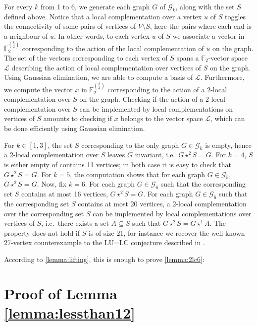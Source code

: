 \documentclass[a4paper,UKenglish,cleveref,autoref,thm-restate]{arxiv}
\newcommand{\se}{\subseteq}
\newcommand{\sm}{\setminus}
\begin{document}
For every $k$ from 1 to 6, we generate each graph $G$ of $\mathcal G_k$, along with the set $S$ defined above. Notice that a local complementation over a vertex $u$ of $S$ toggles the connectivity of some pairs of vertices of $V \sm S$, here the pairs where each end is a neighbour of $u$. In other words, to each vertex $u$ of $S$ we associate a vector in $\mathbb F_2^{\binom{k}{2}}$ corresponding to the action of the local complementation of $u$ on the graph. The set of the vectors corresponding to each vertex of $S$ spans a $\mathbb F_2$-vector space $\mathcal L$ describing the action of local complementation over vertices of $S$ on the graph. Using Gaussian elimination, we are able to compute a basis of $\mathcal L$. Furthermore, we compute the vector $x$ in $\mathbb F_2^{\binom{k}{2}}$ corresponding to the action of a 2-local complementation over $S$ on the graph. Checking if the action of a 2-local complementation over $S$ can be implemented by local complementations on vertices of $S$ amounts to checking if $x$ belongs to the vector space $\mathcal L$, which can be done efficiently using Gaussian elimination.

For $k \in [1,3]$, the set $S$ corresponding to the only graph $G \in \mathcal G_k$ is empty, hence a 2-local complementation over $S$ leaves $G$ invariant, i.e.~$G \star^2 S = G$. For $k = 4$, $S$ is either empty of contains 11 vertices; in both case it is easy to check that $G \star^2 S = G$. For $k = 5$, the computation shows that for each graph $G \in \mathcal G_5$, $G \star^2 S = G$. Now, fix $k=6$. For each graph $G \in \mathcal G_6$ such that the corresponding set $S$ contains at most 16 vertices, $G \star^2 S = G$. For each graph $G \in \mathcal G_6$ such that the corresponding set $S$ contains at most 20 vertices, a 2-local complementation over the corresponding set $S$ can be implemented by local complementations over vertices of $S$, i.e.~there exists a set $A \se S$ such that $G \star^2 S = G \star^1 A$. The property does not hold if $S$ is of size 21, for instance we recover the well-known 27-vertex counterexample to the LU=LC conjecture described in \cite{Tsimakuridze17}.

According to \cref{lemma:lifting}, this is enough to prove \cref{lemma:2lc6}:

\computerassisted*

\section{Proof of Lemma \ref{lemma:lessthan12}} \label{app:lessthan12}
\end{document}
